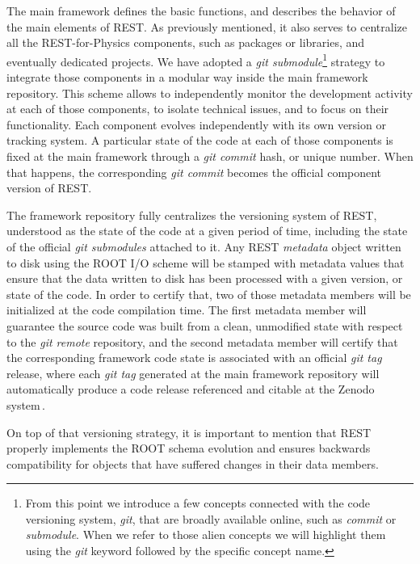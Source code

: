 The main framework defines the basic functions, and describes the behavior of the main elements of REST. As previously mentioned, it also serves to centralize all the REST-for-Physics components, such as packages or libraries, and eventually dedicated projects. We have adopted a \emph{git submodule}\footnote{From this point we introduce a few concepts connected with the code versioning system, \emph{git}, that are broadly available online, such as \emph{commit} or \emph{submodule}. When we refer to those alien concepts we will highlight them using the \emph{git} keyword followed by the specific concept name.} strategy to integrate those components in a modular way inside the main framework repository. This scheme allows to independently monitor the development activity at each of those components, to isolate technical issues, and to focus on their functionality. Each component evolves independently with its own version or tracking system. A particular state of the code at each of those components is fixed at the main framework through a \emph{git commit} hash, or unique number. When that happens, the corresponding \emph{git commit} becomes the official component version of REST.

The framework repository fully centralizes the versioning system of REST, understood as the state of the code at a given period of time, including the state of the official \emph{git submodules} attached to it. Any REST \emph{metadata} object written to disk using the ROOT I/O scheme will be stamped with metadata values that ensure that the data written to disk has been processed with a given version, or state of the code. In order to certify that, two of those metadata members will be initialized at the code compilation time. The first metadata member will guarantee the source code was built from a clean, unmodified state with respect to the \emph{git remote} repository, and the second metadata member will certify that the corresponding framework code state is associated with an official \emph{git tag} release, where each \emph{git tag} generated at the main framework repository will automatically produce a code release referenced and citable at the Zenodo system\,\cite{javier_galan_2021_5092550}.

On top of that versioning strategy, it is important to mention that REST properly implements the ROOT schema evolution and ensures backwards compatibility for objects that have suffered changes in their data members.


